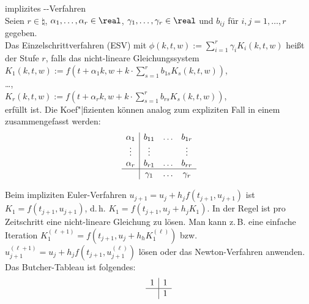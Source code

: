 \begin{Def}{implizites --Verfahren}\\
    Seien $r \in \natural$, $\alpha_1, \dotsc, \alpha_r \in \real$,
    $\gamma_1, \dotsc, \gamma_r \in \real$ und
    $b_{ij}$ für $i, j = 1, \dotsc, r$ gegeben.\\
    Das Einzelschrittverfahren (ESV) mit
    $\phi(k, t, w) := \sum_{i=1}^r \gamma_i K_i(k, t, w)$
    heißt 
    der Stufe $r$, falls das nicht-lineare Gleichungssystem\\
    $K_1(k, t, w) := f(t + \alpha_1 k,
    w + k \cdot \sum_{s=1}^r b_{1s} K_s(k, t, w))$,\\
    \dots,\\
    $K_r(k, t, w) := f(t + \alpha_r k,
    w + k \cdot \sum_{s=1}^r b_{rs} K_s(k, t, w))$,\\
    erfüllt ist.
    Die Koef"|fizienten können analog zum expliziten Fall
    in einem  zusammengefasst werden:
    \begin{align*}
        \begin{array}{c|cccc}
            \alpha_1 & b_{11} & \hdots & b_{1r}\\
            \vdots & \vdots & & \vdots\\
            \alpha_r & b_{r1} & \hdots & b_{rr}\\\hline
            & \gamma_1 & \hdots & \gamma_r
        \end{array}
    \end{align*}
\end{Def}

\linie
\pagebreak

\begin{Bsp}
    Beim impliziten Euler-Verfahren
    $u_{j+1} = u_j + h_j f(t_{j+1}, u_{j+1})$ ist
    $K_1 = f(t_{j+1}, u_{j+1})$, d.\,h.
    $K_1 = f(t_{j+1}, u_j + h_j K_1)$.
    In der Regel ist pro Zeitschritt eine nicht-lineare Gleichung zu lösen.
    Man kann z.\,B. eine einfache Iteration
    $K_1^{(\ell+1)} = f(t_{j+1}, u_j + h_h K_1^{(\ell)})$ bzw.\\
    $u_{j+1}^{(\ell+1)} = u_j + h_j f(t_{j+1}, u_{j+1}^{(\ell)})$ lösen
    oder das Newton-Verfahren anwenden.\\
    Das Butcher-Tableau ist folgendes:
    \begin{align*}
        \begin{array}{c|c}
            1 & 1\\\hline
            & 1
        \end{array}
    \end{align*}
\end{Bsp}

